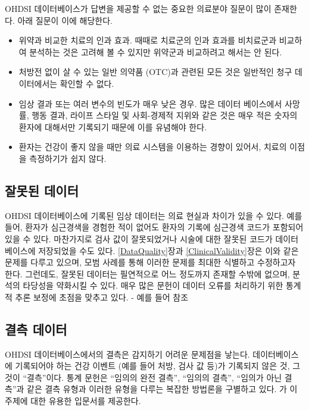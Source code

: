\documentclass[10.5pt]{book}
\providecommand{\tightlist}{%
  \setlength{\itemsep}{0pt}\setlength{\parskip}{0pt}}
\theoremstyle{definition}
\theoremstyle{definition}
\theoremstyle{definition}
\theoremstyle{remark}
\begin{document}

OHDSI 데이터베이스가 답변을 제공할 수 없는 중요한 의료분야 질문이 많이
존재한다. 아래 질문이 이에 해당한다.

\begin{itemize}
\tightlist
\item
  위약과 비교한 치료의 인과 효과. 때때로 치료군의 인과 효과를 비치료군과
  비교하여 분석하는 것은 고려해 볼 수 있지만 위약군과 비교하려고 해서는
  안 된다.
\item
  처방전 없이 살 수 있는 일반 의약품 (OTC)과 관련된 모든 것은 일반적인
  청구 데이터에서는 확인할 수 없다.
\item
  임상 결과 또는 여러 변수의 빈도가 매우 낮은 경우. 많은 데이터
  베이스에서 사망률, 행동 결과, 라이프 스타일 및 사회-경제적 지위와 같은
  것은 매우 적은 숫자의 환자에 대해서만 기록되기 때문에 이를 유념해야
  한다.
\item
  환자는 건강이 좋지 않을 때만 의료 시스템을 이용하는 경향이 있어서,
  치료의 이점을 측정하기가 쉽지 않다.
\end{itemize}

\subsection{잘못된 데이터}\label{-}

OHDSI 데이터베이스에 기록된 임상 데이터는 의료 현실과 차이가 있을 수
있다. 예를 들어, 환자가 심근경색을 경험한 적이 없어도 환자의 기록에
심근경색 코드가 포함되어 있을 수 있다. 마찬가지로 검사 값이 잘못되었거나
시술에 대한 잘못된 코드가 데이터베이스에 저장되었을 수도 있다.
\ref{DataQuality}장과 \ref{ClinicalValidity}장은 이와 같은 문제를 다루고
있으며, 모범 사례를 통해 이러한 문제를 최대한 식별하고 수정하고자 한다.
그런데도, 잘못된 데이터는 필연적으로 어느 정도까지 존재할 수밖에 없으며,
분석의 타당성을 약화시킬 수 있다. 매우 많은 문헌이 데이터 오류를
처리하기 위한 통계적 추론 보정에 초점을 맞추고 있다. - 예를 들어
\citet{fuller2009measurement} 참조

\subsection{결측 데이터}\label{-}


OHDSI 데이터베이스에서의 결측은 감지하기 어려운 문제점을 낳는다.
데이터베이스에 기록되어야 하는 건강 이벤트 (예를 들어 처방, 검사 값
등)가 기록되지 않은 것, 그것이 ``결측''이다. 통계 문헌은 ``임의의 완전
결측'', ``임의의 결측'', ``임의가 아닌 결측''과 같은 결측 유형과 이러한
유형을 다루는 복잡한 방법론을 구별하고 있다.
\citet{perkins2017principled} 가 이 주제에 대한 유용한 입문서를
제공한다.
\end{document}
